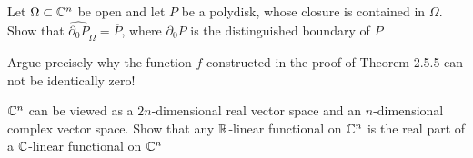 \documentclass[../main.tex]{subfiles}
\begin{document}
\begin{problem}
Let $\Omega \subset \Bbb C^n$ be open and let $P$ be a polydisk, whose closure is contained in  $\Omega$. Show that $\widehat{\partial_0 P}_\Omega = \overline{P}$, where ${\partial_0 P}$ is the distinguished boundary of $P$
\end{problem}

\begin{problem}
Argue precisely why the function $f$ constructed in the proof of Theorem 2.5.5 can not be identically zero!
\end{problem}

\begin{problem}
$\Bbb C^n$ can be viewed as a $2n$-dimensional real vector space and an $n$-dimensional complex vector space. Show that any $\Bbb R$-linear functional on $\Bbb C^n$ is the real part of a $\Bbb C$-linear functional on $\Bbb C^n$
\end{problem}
\end{document}

